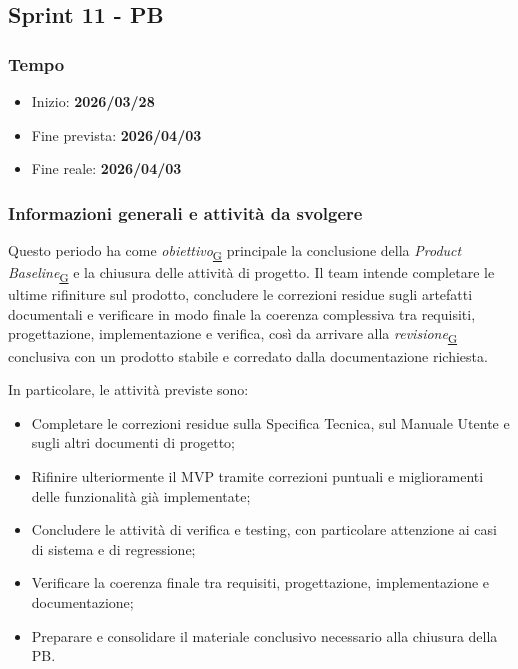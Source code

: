 \documentclass[a4paper,12pt]{article}
\begin{document}
       \subsection{Sprint 11 - PB}{
    \subsubsection{Tempo}{
        \begin{itemize}
            \item[] Inizio: \textbf{2026/03/28} 
            \item[] Fine prevista: \textbf{2026/04/03} 
            \item[] Fine reale: \textbf{2026/04/03} 
        \end{itemize}
    }

    \subsubsection{Informazioni generali e attività da svolgere}{
        Questo periodo ha come \textit{obiettivo}\textsubscript{\href{https://atlasteam9.github.io/Atlas/glossario.html\#Obiettivo}{G}} principale la conclusione della \textit{Product Baseline}\textsubscript{\href{https://atlasteam9.github.io/Atlas/glossario.html\#Baseline}{G}} e la chiusura delle attività di progetto. Il team intende completare le ultime rifiniture sul prodotto, concludere le correzioni residue sugli artefatti documentali e verificare in modo finale la coerenza complessiva tra requisiti, progettazione, implementazione e verifica, così da arrivare alla \textit{revisione}\textsubscript{\href{https://atlasteam9.github.io/Atlas/glossario.html\#Revisione}{G}} conclusiva con un prodotto stabile e corredato dalla documentazione richiesta.
    }
        
    \noindent In particolare, le attività previste sono:
        \begin{itemize}
            \item Completare le correzioni residue sulla Specifica Tecnica, sul Manuale Utente e sugli altri documenti di progetto;
            \item Rifinire ulteriormente il MVP tramite correzioni puntuali e miglioramenti delle funzionalità già implementate;
            \item Concludere le attività di verifica e testing, con particolare attenzione ai casi di sistema e di regressione;
            \item Verificare la coerenza finale tra requisiti, progettazione, implementazione e documentazione;
            \item Preparare e consolidare il materiale conclusivo necessario alla chiusura della PB.
        \end{itemize}
    }
\end{document}
